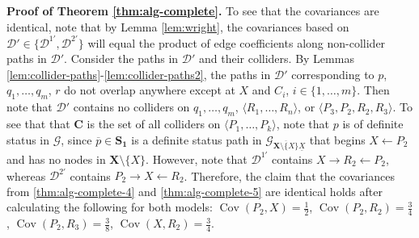 \documentclass[11pt]{article}
\DeclareMathOperator{\Cov}{Cov}
\newcommand{\mb}[1]{\mathbf{#1}}
\newcommand{\g}[1][G]{\mathcal{#1}}
\newenvironment{proofofnoqed}[1][]{\noindent \textbf{Proof of #1.}}{}
\begin{document}
\begin{proofofnoqed}[Theorem \ref{thm:alg-complete}]
    To see that the covariances are identical, note that by Lemma \ref{lem:wright}, the covariances based on $\g[D]' \in \{ \g[D]^{1'}, \g[D]^{2'} \}$ will equal the product of edge coefficients along non-collider paths in $\g[D]'$. Consider the paths in $\g[D]'$ and their colliders. By Lemmas \ref{lem:collider-paths}-\ref{lem:collider-paths2}, the paths in $\g[D]'$ corresponding to $p$, $q_1, \dots, q_m$, $r$ do not overlap anywhere except at $X$ and $C_i$, $i \in \{1, \dots, m\}$. Then note that $\g[D]'$ contains no colliders on $q_1, \dots, q_m$, $\langle R_1, \dots, R_n \rangle$, or $\langle P_3, P_2, R_2, R_3 \rangle$. To see that that $\mb{C}$ is the set of all colliders on $\langle P_1, \dots, P_k \rangle$, note that $p$ is of definite status in $\g$, since $\overline{p} \in \mb{S_1}$ is a definite status path in $\g_{\overline{\mb{X} \setminus \{X\}} \underline{X}}$ that begins $X \gets P_2$ and has no nodes in $\mb{X} \setminus \{X\}$. However, note that $\g[D]^{1'}$ contains $X \to R_2 \gets P_2$, whereas $\g[D]^{2'}$ contains $P_2 \to X \gets R_2$. Therefore, the claim that the covariances from \eqref{thm:alg-complete-4} and \eqref{thm:alg-complete-5} are identical holds after calculating the following for both models: $\Cov(P_2,X)=\tfrac{1}{2}$, $\Cov(P_2,R_2)=\tfrac{3}{4}$, $\Cov(P_2,R_3)=\tfrac{3}{8}$, $\Cov(X,R_2)=\tfrac{3}{4}$.


\end{proofofnoqed}
\end{document}
